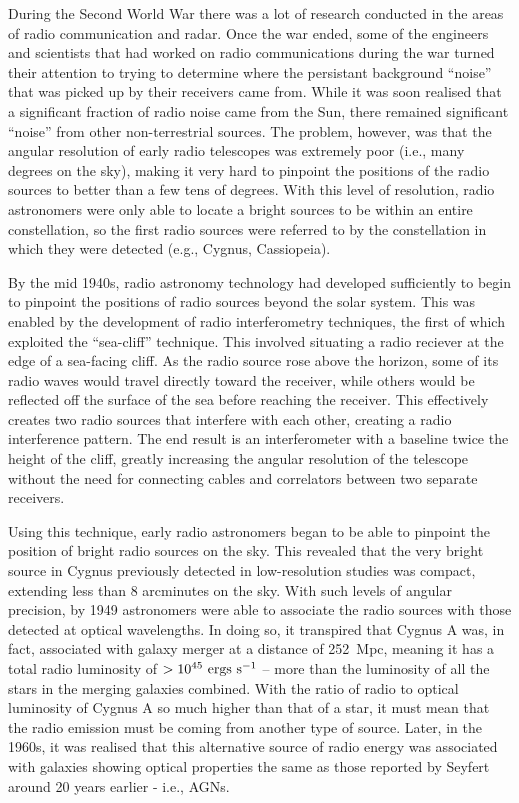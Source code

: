 \documentclass[11pt]{article}
\begin{document}
During the Second World War there was a lot of research conducted in
the areas of radio communication and radar. Once the war ended, some
of the engineers and scientists that had worked on radio
communications during the war turned their attention to trying to
determine where the persistant background ``noise'' that was picked up
by their receivers came from. While it was soon realised that a
significant fraction of radio noise came from the Sun, there remained
significant ``noise'' from other non-terrestrial sources. The problem,
however, was that the angular resolution of early radio telescopes was
extremely poor (i.e., many degrees on the sky), making it very hard to
pinpoint the positions of the radio sources to better than a few tens of
degrees. With this level of resolution, radio astronomers were only
able to locate a bright sources to be within an entire constellation,
so the first radio sources were referred to by the constellation in
which they were detected (e.g., Cygnus, Cassiopeia).

By the mid 1940s, radio astronomy technology had developed
sufficiently to begin to pinpoint the positions of radio sources
beyond the solar system. This was enabled by the development of radio
interferometry techniques, the first of which exploited the
``sea-cliff'' technique. This involved situating a radio reciever at
the edge of a sea-facing cliff. As the radio source rose above the
horizon, some of its radio waves would travel directly toward the
receiver, while others would be reflected off the surface of the sea
before reaching the receiver. This effectively creates two radio
sources that interfere with each other, creating a radio interference
pattern. The end result is an interferometer with a baseline twice the
height of the cliff, greatly increasing the angular resolution of the
telescope without the need for connecting cables and correlators
between two separate receivers.

Using this technique, early radio astronomers began to be able to
pinpoint the position of bright radio sources on the sky. This
revealed that the very bright source in Cygnus previously detected in
low-resolution studies was compact, extending less than 8 arcminutes
on the sky. With such levels of angular precision, by 1949 astronomers
were able to associate the radio sources with those detected at
optical wavelengths. In doing so, it transpired that Cygnus A was, in
fact, associated with galaxy merger at a distance of 252~Mpc, meaning
it has a total radio luminosity of $>10^{45}~{\rm ergs~s^{-1}}$ --
more than the luminosity of all the stars in the merging galaxies
combined.  With the ratio of radio to optical luminosity of Cygnus A
so much higher than that of a star, it must mean that the radio
emission must be coming from another type of source. Later, in the
1960s, it was realised that this alternative source of radio energy
was associated with galaxies showing optical properties the same as
those reported by Seyfert around 20 years earlier - i.e., AGNs.
\end{document}
